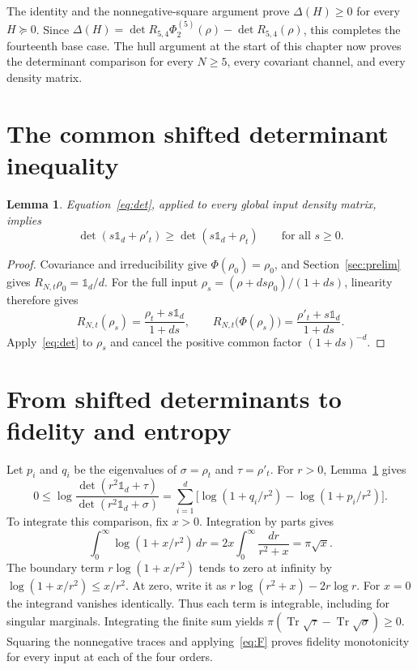 \documentclass[11pt,a4paper]{article}
\newcommand{\Tr}{\operatorname{Tr}}
\newcommand{\id}{\mathds{1}}
\newtheorem{lemma}{Lemma}
\begin{document}
The identity and the nonnegative-square argument prove
$\Delta(H)\ge0$ for every $H\succeq0$. Since
$\Delta(H)=\det R_{5,4}\Phi_2^{(5)}(\rho)-\det R_{5,4}(\rho)$,
this completes the fourteenth base case. The hull argument at the
start of this chapter now proves the determinant comparison for every
$N\ge5$, every covariant channel, and every density matrix.

\clearpage\section{The common shifted determinant inequality}\label{sec:shift}
\begin{lemma}\label{lem:shift}
Equation~\eqref{eq:det}, applied to every global input density matrix, implies
\[
 \det(s\id_d+\rho'_t)\ge\det(s\id_d+\rho_t)
 \qquad\text{for all }s\ge0.
\]
\end{lemma}
\begin{proof}
Covariance and irreducibility give $\Phi(\rho_0)=\rho_0$, and
Section~\ref{sec:prelim} gives $R_{N,t}\rho_0=\id_d/d$.
For the full input $\rho_s=(\rho+ds\rho_0)/(1+ds)$, linearity
therefore gives
\[
 R_{N,t}(\rho_s)=\frac{\rho_t+s\id_d}{1+ds},\qquad
 R_{N,t}\bigl(\Phi(\rho_s)\bigr)=\frac{\rho'_t+s\id_d}{1+ds}.
\]
Apply~\eqref{eq:det} to $\rho_s$ and cancel the positive common
factor $(1+ds)^{-d}$.
\end{proof}

\section{From shifted determinants to fidelity and entropy}\label{sec:spectral}
Let $p_i$ and $q_i$ be the eigenvalues of $\sigma=\rho_t$ and $\tau=\rho'_t$.
For $r>0$, Lemma~\ref{lem:shift} gives
\[
 0\le\log\frac{\det(r^2\id_d+\tau)}{\det(r^2\id_d+\sigma)}
 =\sum_{i=1}^d\bigl[\log(1+q_i/r^2)-\log(1+p_i/r^2)\bigr].
\]
To integrate this comparison, fix $x>0$. Integration by parts gives
\[
 \int_0^\infty\log(1+x/r^2)\,dr
  =2x\int_0^\infty\frac{dr}{r^2+x}=\pi\sqrt{x}.
\]
The boundary term $r\log(1+x/r^2)$ tends to zero at infinity by
$\log(1+x/r^2)\le x/r^2$. At zero, write it as
$r\log(r^2+x)-2r\log r$. For $x=0$ the integrand vanishes identically.
Thus each term is integrable, including for singular marginals. Integrating
the finite sum yields $\pi(\Tr\sqrt\tau-\Tr\sqrt\sigma)\ge0$.
Squaring the nonnegative traces and applying~\eqref{eq:F} proves fidelity
monotonicity for every input at each of the four orders.
\end{document}
